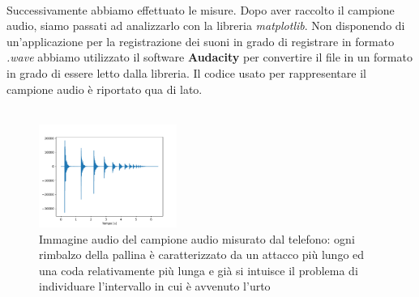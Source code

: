 \documentclass{article}
\begin{document}
\noindent \\ Successivamente abbiamo effettuato le misure. Dopo aver raccolto il campione audio, siamo passati ad analizzarlo con la libreria \emph{matplotlib}. Non disponendo di un'applicazione per la registrazione dei suoni in grado di registrare in formato \emph{.wave} abbiamo utilizzato il software \textbf{Audacity} per convertire il file in un formato in grado di essere letto dalla libreria. Il codice usato per rappresentare il campione audio è riportato qua di lato. \\ \\
\newpage

\begin{figure}
	\centering
	\includegraphics[width=0.4\textwidth, scale=0.25]{Grafico_rimbalzo.pdf}
	\caption{Immagine audio del campione audio misurato dal telefono: ogni rimbalzo della pallina è caratterizzato da un attacco più lungo ed una coda relativamente più lunga e già si intuisce il problema di individuare l'intervallo in cui è avvenuto l'urto}
	\label{fig:audio}
\end{figure}
\end{document}
